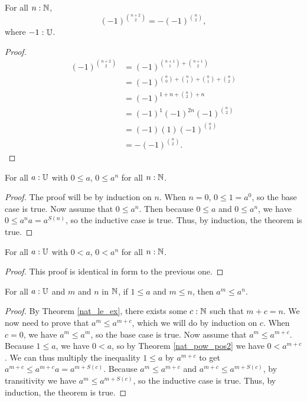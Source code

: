 \documentclass[../math.tex]{subfiles}
\begin{document}
\begin{theorem} \label{nat_pow_neg_binom2}
    For all $n : \mathbb{N}$,
    \[
        (-1)^{\binom{n + 2}{2}} = -(-1)^{\binom{n}{2}},
    \]
    where $-1 : \mathbb{U}$.
\end{theorem}
\begin{proof}
    \begin{align*}
        (-1)^{\binom{n + 2}{2}}
        &= (-1)^{\binom{n + 1}{1} + \binom{n + 1}{2}} \\
        &= (-1)^{\binom{n}{0} + \binom{n}{1} + \binom{n}{1} + \binom{n}{2}} \\
        &= (-1)^{1 + n + \binom{n}{2} + n} \\
        &= (-1)^{1} (-1)^{2n} (-1)^{\binom{n}{2}} \\
        &= (-1) (1) (-1)^{\binom{n}{2}} \\
        &= -(-1)^{\binom{n}{2}}.
    \end{align*}
\end{proof}

\begin{theorem} \label{nat_pow_pos}
    For all $a : \mathbb{U}$ with $0 \leq a$, $0 \leq a^n$ for all $n : \mathbb{N}$.
\end{theorem}
\begin{proof}
    The proof will be by induction on $n$.  When $n = 0$, $0 \leq 1 = a^0$, so
    the base case is true.  Now assume that $0 \leq a^n$.  Then because $0 \leq
    a$ and $0 \leq a^n$, we have $0 \leq a^na = a^{S(n)}$, so the inductive case
    is true.  Thus, by induction, the theorem is true.
\end{proof}

\begin{theorem} \label{nat_pow_pos2}
    For all $a : \mathbb{U}$ with $0 < a$, $0 < a^n$ for all $n : \mathbb{N}$.
\end{theorem}
\begin{proof}
    This proof is identical in form to the previous one.
\end{proof}

\begin{theorem}
    For all $a : \mathbb{U}$ and $m$ and $n$ in $\mathbb{N}$, if $1 \leq a$ and $m \leq n$, then
    $a^m \leq a^n$.
\end{theorem}
\begin{proof}
    By Theorem \ref{nat_le_ex}, there exists some $c : \mathbb{N}$ such that $m + c =
    n$.  We now need to prove that $a^m \leq a^{m + c}$, which we will do by
    induction on $c$.  When $c = 0$, we have $a^m \leq a^m$, so the base case is
    true.  Now assume that $a^m \leq a^{m + c}$.  Because $1 \leq a$, we have $0
    < a$, so by Theorem \ref{nat_pow_pos2} we have $0 < a^{m + c}$.  We can thus
    multiply the inequality $1 \leq a$ by $a^{m + c}$ to get $a^{m + c} \leq
    a^{m + c}a = a^{m + S(c)}$.  Because $a^m \leq a^{m + c}$ and $a^{m + c}
    \leq a^{m + S(c)}$, by transitivity we have $a^m \leq a^{m + S(c)}$, so the
    inductive case is true.  Thus, by induction, the theorem is true.
\end{proof}
\end{document}
